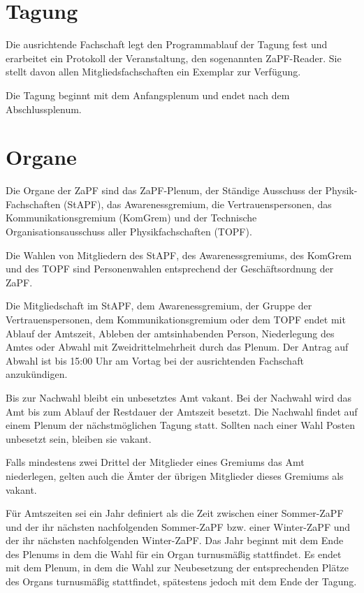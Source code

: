 \documentclass[
  a4paper,
  oneside]{scrartcl}
\begin{document}
\section{Tagung}\label{tagung}

Die ausrichtende Fachschaft legt den Programmablauf der Tagung fest und
erarbeitet ein Protokoll der Veranstaltung, den sogenannten ZaPF-Reader.
Sie stellt davon allen Mitgliedsfachschaften ein Exemplar zur Verfügung.

Die Tagung beginnt mit dem Anfangsplenum und endet nach dem
Abschlussplenum.

\section{Organe}\label{organe}

Die Organe der ZaPF sind das ZaPF-Plenum, der Ständige Ausschuss der
Physik-Fachschaften (StAPF), das Awarenessgremium, die
Vertrauenspersonen, das Kommunikationsgremium (KomGrem) und der
Technische Organisationsausschuss aller Physikfachschaften (TOPF).

Die Wahlen von Mitgliedern des StAPF, des Awarenessgremiums, des KomGrem
und des TOPF sind Personenwahlen entsprechend der Geschäftsordnung der
ZaPF.

Die Mitgliedschaft im StAPF, dem Awarenessgremium, der Gruppe der
Vertrauenspersonen, dem Kommunikationsgremium oder dem TOPF endet mit
Ablauf der Amtszeit, Ableben der amtsinhabenden Person, Niederlegung des
Amtes oder Abwahl mit Zweidrittelmehrheit durch das Plenum. Der Antrag
auf Abwahl ist bis 15:00 Uhr am Vortag bei der ausrichtenden Fachschaft
anzukündigen.

Bis zur Nachwahl bleibt ein unbesetztes Amt vakant. Bei der Nachwahl
wird das Amt bis zum Ablauf der Restdauer der Amtszeit besetzt. Die
Nachwahl findet auf einem Plenum der nächstmöglichen Tagung statt.
Sollten nach einer Wahl Posten unbesetzt sein, bleiben sie vakant.

Falls mindestens zwei Drittel der Mitglieder eines Gremiums das Amt
niederlegen, gelten auch die Ämter der übrigen Mitglieder dieses
Gremiums als vakant.

Für Amtszeiten sei ein Jahr definiert als die Zeit zwischen einer
Sommer-ZaPF und der ihr nächsten nachfolgenden Sommer-ZaPF bzw. einer
Winter-ZaPF und der ihr nächsten nachfolgenden Winter-ZaPF. Das Jahr
beginnt mit dem Ende des Plenums in dem die Wahl für ein Organ
turnusmäßig stattfindet. Es endet mit dem Plenum, in dem die Wahl zur
Neubesetzung der entsprechenden Plätze des Organs turnusmäßig
stattfindet, spätestens jedoch mit dem Ende der Tagung.
\end{document}
